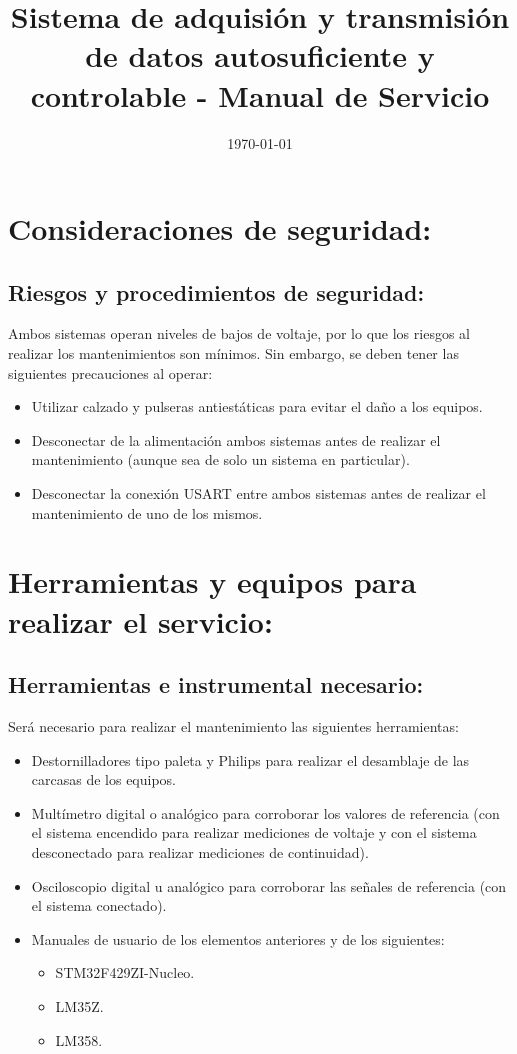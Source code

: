 \documentclass[conference]{IEEEtran}
\date{\today}
\title{Sistema de adquisión y transmisión de datos autosuficiente y controlable - Manual de Servicio}
\begin{document}
\maketitle
\tableofcontents


\section{Consideraciones de seguridad:}
\label{sec:org6dcd27d}
\subsection{Riesgos y procedimientos de seguridad:}
\label{sec:org69151f7}
Ambos sistemas operan niveles de bajos de voltaje, por lo que los riesgos al realizar los mantenimientos son mínimos. Sin embargo, se deben tener las siguientes precauciones al operar:

\begin{itemize}
\item Utilizar calzado y pulseras antiestáticas para evitar el daño a los equipos.
\item Desconectar de la alimentación ambos sistemas antes de realizar el mantenimiento (aunque sea de solo un sistema en particular).
\item Desconectar la conexión USART entre ambos sistemas antes de realizar el mantenimiento de uno de los mismos.
\end{itemize}
\section{Herramientas y equipos para realizar el servicio:}
\label{sec:org797bdca}
\subsection{Herramientas e instrumental necesario:}
\label{sec:org86daaff}
Será necesario para realizar el mantenimiento las siguientes herramientas:

\begin{itemize}
\item Destornilladores tipo paleta y Philips para realizar el desamblaje de las carcasas de los equipos.
\item Multímetro digital o analógico para corroborar los valores de referencia (con el sistema encendido para realizar mediciones de voltaje y con el sistema desconectado para realizar mediciones de continuidad).
\item Osciloscopio digital u analógico para corroborar las señales de referencia (con el sistema conectado).
\item Manuales de usuario de los elementos anteriores y de los siguientes:
\begin{itemize}
\item STM32F429ZI-Nucleo.
\item LM35Z.
\item LM358.
\end{itemize}
\end{itemize}
\end{document}
